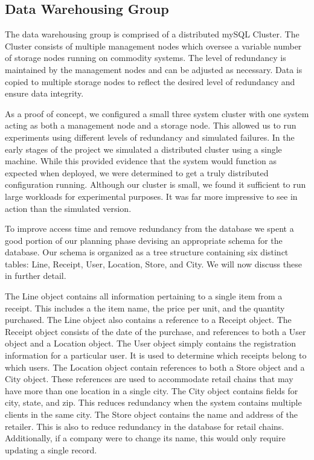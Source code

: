 \subsection{Data Warehousing Group}
\label{sec:implementation.db}

The data warehousing group is comprised of a distributed mySQL
Cluster.  The Cluster consists of multiple management nodes which
oversee a variable number of storage nodes running on commodity
systems.  The level of redundancy is maintained by the management
nodes and can be adjusted as necessary.  Data is copied to multiple
storage nodes to reflect the desired level of redundancy and ensure
data integrity.

As a proof of concept, we configured a small three system cluster with
one system acting as both a management node and a storage node.  This
allowed us to run experiments using different levels of redundancy and
simulated failures.  In the early stages of the project we simulated a
distributed cluster using a single machine.  While this provided
evidence that the system would function as expected when deployed, we
were determined to get a truly distributed configuration running.
Although our cluster is small, we found it sufficient to run large
workloads for experimental purposes.  It was far more impressive to
see in action than the simulated version.

To improve access time and remove redundancy from the database we
spent a good portion of our planning phase devising an appropriate
schema for the database.  Our schema is organized as a tree structure
containing six distinct tables: Line, Receipt, User, Location, Store, and
City.  We will now discuss these in further detail.

The Line object contains all information pertaining to a single item
from a receipt.  This includes a the item name, the price per unit,
and the quantity purchased.  The Line object also contains a reference
to a Receipt object.  The Receipt object consists of the date of the
purchase, and references to both a User object and a Location object.
The User object simply contains the registration information for a
particular user.  It is used to determine which receipts belong to
which users.  The Location object contain references to both a Store
object and a City object.  These references are used to accommodate
retail chains that may have more than one location in a single city.
The City object contains fields for city, state, and zip.  This
reduces redundancy when the system contains multiple clients in the
same city.  The Store object contains the name and address of the
retailer.  This is also to reduce redundancy in the database for
retail chains.  Additionally, if a company were to change its name,
this would only require updating a single record.

